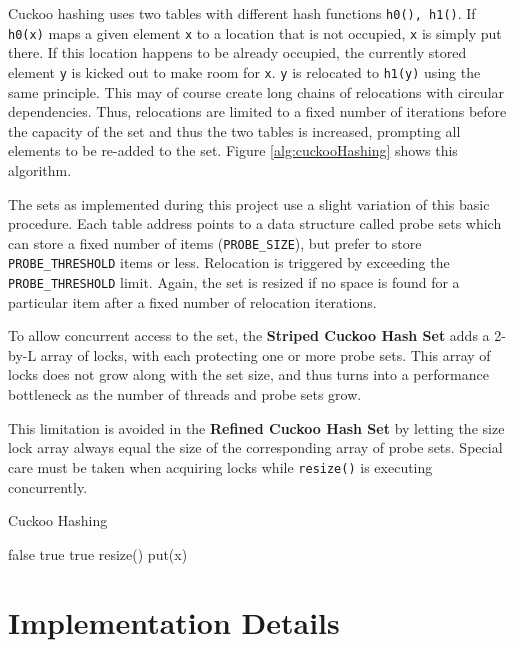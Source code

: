 \documentclass[a4paper,10pt]{article}
\begin{document}
Cuckoo hashing uses two tables with different hash functions
\lstinline|h0(), h1()|. If \lstinline|h0(x)| maps a given element \lstinline|x|
to a location that is not occupied, \lstinline|x| is simply put there. If this
location happens to be already occupied, the currently stored element
\lstinline|y| is kicked out to make room for \lstinline|x|. \lstinline|y| is
relocated to \lstinline|h1(y)| using the same principle. This may of course
create long chains of relocations with circular dependencies. Thus, relocations
are limited to a fixed number of iterations before the capacity of the set and
thus the two tables is increased, prompting all elements to be re-added to the
set.  Figure \ref{alg:cuckooHashing} shows this algorithm.

The sets as implemented during this project use a slight variation of this
basic procedure. Each table address points to a data structure called probe sets
which can store a fixed number of items (\lstinline|PROBE_SIZE|), but prefer
to store \lstinline|PROBE_THRESHOLD| items or less. Relocation is triggered
by exceeding the \lstinline|PROBE_THRESHOLD| limit. Again, the set is resized
if no space is found for a particular item after a fixed number of relocation
iterations.

To allow concurrent access to the set, the \textbf{Striped Cuckoo Hash Set}
adds a 2-by-L array of locks, with each protecting one or more probe sets.
This array of locks does not grow along with the set size, and thus turns into
a performance bottleneck as the number of threads and probe sets grow.

This limitation is avoided in the \textbf{Refined Cuckoo Hash Set} by letting
the size lock array always equal the size of the corresponding array of probe
sets. Special care must be taken when acquiring locks while
\lstinline|resize()| is executing concurrently.

\begin{algorithm}
\caption{Cuckoo Hashing}
\label{alg:cuckooHashing}
\begin{algorithmic}[5]
		\State \Return false
	\EndIf
			\State \Return true
			\State \Return true
		\EndIf
	\EndFor
	\State resize()
	\State put(x)
\EndFunction
\end{algorithmic}
\end{algorithm}

\section{Implementation Details}
\label{sec:implDetails}
\end{document}

